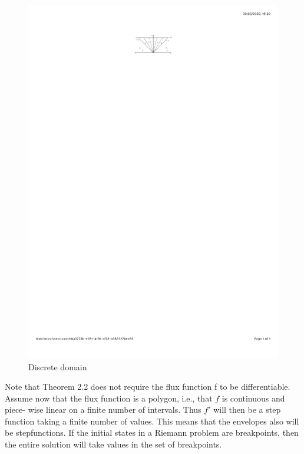 \documentclass{article}
\numberwithin{equation}{section}
\begin{document}
\begin{figure}
    \begin{center}
        \includegraphics[valign = c,clip, trim=8cm 25.5cm 2cm 2.5cm, width=1.2\textwidth]{Figures/ConservationLaws/discrete_domain.pdf}
    \caption{Discrete domain}
    \label{Fig:discrete_domain}
    \end{center}
\end{figure}{}	 

Note that Theorem 2.2 does not require the flux function f to be differentiable. Assume now that the flux function is a polygon, i.e., that $f$ is continuous and piece- wise linear on a finite number of intervals. Thus $f'$ will then be a step function taking a finite number of values.    This means that the envelopes also will be stepfunctions. If the initial states in a Riemann problem are breakpoints, then the entire solution will take values in the set of breakpoints.
\end{document}

